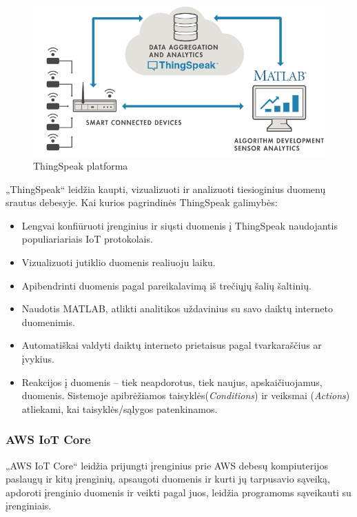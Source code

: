 \documentclass{VUMIFInfBakalaurinis}
\begin{document}
\begin{figure}[H]
  \centering
  \includegraphics[scale=0.5]{img/thing-speak-arch}
  \caption{ThingSpeak platforma}   %
  \label{img:mlp}
\end{figure}

„ThingSpeak“ leidžia kaupti, vizualizuoti ir analizuoti tiesioginius duomenų srautus debesyje. Kai kurios pagrindinės ThingSpeak galimybės:

\begin{itemize}
\item Lengvai konfiūruoti įrenginius ir siųsti duomenis į ThingSpeak naudojantis populiariariais IoT protokolais.
\item Vizualizuoti jutiklio duomenis realiuoju laiku.
\item Apibendrinti duomenis pagal pareikalavimą iš trečiųjų šalių šaltinių.
\item Naudotis MATLAB, atlikti analitikos uždavinius su savo daiktų interneto duomenimis.
\item Automatiškai valdyti daiktų interneto prietaisus pagal tvarkaraščius ar įvykius.
\item Reakcijos į duomenis – tiek neapdorotus, tiek naujus, apskaičiuojamus, duomenis. Sistemoje apibrėžiamos taisyklės(\emph{Conditions}) ir veiksmai (\emph{Actions}) atliekami, kai taisyklės/sąlygos patenkinamos.
\end{itemize}

\subsubsection{AWS IoT Core}
„AWS IoT Core“ leidžia prijungti įrenginius prie AWS debesų kompiuterijos paslaugų ir kitų įrenginių, apsaugoti duomenis ir kurti jų tarpusavio sąveiką, apdoroti įrenginio duomenis ir veikti pagal juos,
leidžia programoms sąveikauti su įrenginiais.
\end{document}
